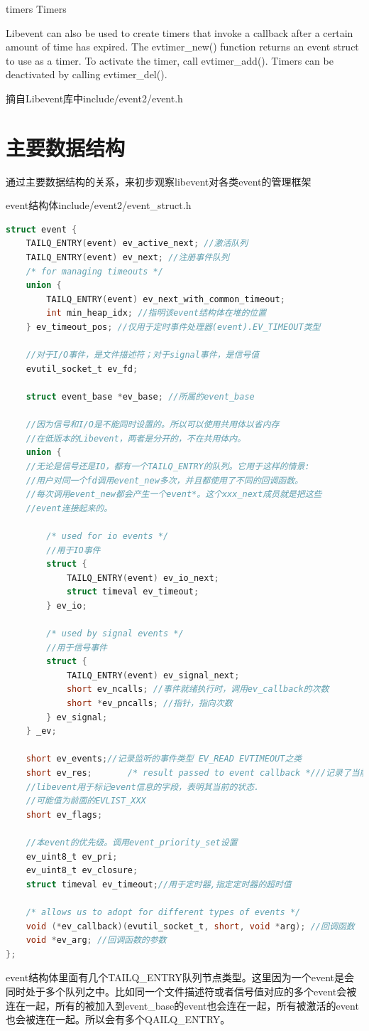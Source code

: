 \documentclass[11pt,a4paper]{article}
\begin{document}
timers Timers

Libevent can also be used to create timers that invoke a callback after a certain amount of time has expired. The evtimer\_new() function returns an event struct to use as a timer. To activate the timer, call evtimer\_add(). Timers can be deactivated by calling evtimer\_del().

摘自Libevent库中include/event2/event.h

\newpage

\section{主要数据结构}\label{S.MainStructure}
通过主要数据结构的关系，来初步观察libevent对各类event的管理框架

event结构体include/event2/event\_struct.h
\begin{lstlisting}[language=C]
struct event {
	TAILQ_ENTRY(event) ev_active_next; //激活队列
	TAILQ_ENTRY(event) ev_next; //注册事件队列
	/* for managing timeouts */
	union {
		TAILQ_ENTRY(event) ev_next_with_common_timeout;
		int min_heap_idx; //指明该event结构体在堆的位置
	} ev_timeout_pos; //仅用于定时事件处理器(event).EV_TIMEOUT类型

	//对于I/O事件，是文件描述符；对于signal事件，是信号值
	evutil_socket_t ev_fd;

	struct event_base *ev_base; //所属的event_base

	//因为信号和I/O是不能同时设置的。所以可以使用共用体以省内存
	//在低版本的Libevent，两者是分开的，不在共用体内。
	union {
	//无论是信号还是IO，都有一个TAILQ_ENTRY的队列。它用于这样的情景:
	//用户对同一个fd调用event_new多次，并且都使用了不同的回调函数。
	//每次调用event_new都会产生一个event*。这个xxx_next成员就是把这些
	//event连接起来的。
	
		/* used for io events */
		//用于IO事件
		struct {
			TAILQ_ENTRY(event) ev_io_next;
			struct timeval ev_timeout;
		} ev_io;

		/* used by signal events */
		//用于信号事件
		struct {
			TAILQ_ENTRY(event) ev_signal_next;
			short ev_ncalls; //事件就绪执行时，调用ev_callback的次数			/* Allows deletes in callback */
			short *ev_pncalls; //指针，指向次数
		} ev_signal;
	} _ev;

	short ev_events;//记录监听的事件类型 EV_READ EVTIMEOUT之类
	short ev_res;		/* result passed to event callback *///记录了当前激活事件的类型
	//libevent用于标记event信息的字段，表明其当前的状态.
	//可能值为前面的EVLIST_XXX
	short ev_flags; 

	//本event的优先级。调用event_priority_set设置
	ev_uint8_t ev_pri;
	ev_uint8_t ev_closure;
	struct timeval ev_timeout;//用于定时器,指定定时器的超时值

	/* allows us to adopt for different types of events */
	void (*ev_callback)(evutil_socket_t, short, void *arg); //回调函数
	void *ev_arg; //回调函数的参数
};
\end{lstlisting}
event结构体里面有几个TAILQ\_ENTRY队列节点类型。这里因为一个event是会同时处于多个队列之中。比如同一个文件描述符或者信号值对应的多个event会被连在一起，所有的被加入到event\_base的event也会连在一起，所有被激活的event也会被连在一起。所以会有多个QAILQ\_ENTRY。
\end{document}
